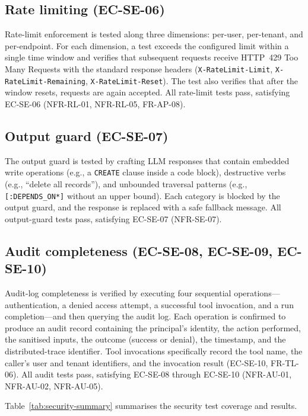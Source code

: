 \documentclass[a4paper,noexaminfo]{sapthesis}
\begin{document}
\subsection{Rate limiting (EC-SE-06)}

Rate-limit enforcement is tested along three dimensions: per-user,
per-tenant, and per-endpoint.  For each dimension, a test exceeds the
configured limit within a single time window and verifies that subsequent
requests receive HTTP~429 Too Many Requests with the standard response
headers (\texttt{X-RateLimit-Limit}, \texttt{X-RateLimit-Remaining},
\texttt{X-RateLimit-Reset}).  The test also verifies that after the
window resets, requests are again accepted.  All rate-limit tests pass,
satisfying EC-SE-06 (NFR-RL-01, NFR-RL-05, FR-AP-08).

\subsection{Output guard (EC-SE-07)}

The output guard is tested by crafting LLM responses that contain
embedded write operations (e.g., a \texttt{CREATE} clause inside a
code block), destructive verbs (e.g., ``delete all records''), and
unbounded traversal patterns (e.g., \texttt{[:DEPENDS\_ON*]} without
an upper bound).  Each category is blocked by the output guard, and
the response is replaced with a safe fallback message.  All output-guard
tests pass, satisfying EC-SE-07 (NFR-SE-07).

\subsection{Audit completeness (EC-SE-08, EC-SE-09, EC-SE-10)}

Audit-log completeness is verified by executing four sequential
operations---authentication, a denied access attempt, a successful tool
invocation, and a run completion---and then querying the audit log.
Each operation is confirmed to produce an audit record containing the
principal's identity, the action performed, the sanitised inputs, the
outcome (success or denial), the timestamp, and the distributed-trace
identifier.  Tool invocations specifically record the tool name, the
caller's user and tenant identifiers, and the invocation result
(EC-SE-10, FR-TL-06).  All audit tests pass, satisfying EC-SE-08
through EC-SE-10 (NFR-AU-01, NFR-AU-02, NFR-AU-05).

\medskip
\noindent
Table~\ref{tab:security-summary} summarises the security test coverage
and results.
\end{document}
